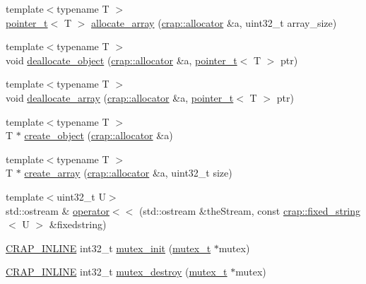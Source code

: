 \begin{DoxyCompactItemize}
\item 
{\footnotesize template$<$typename T $>$ }\\\hyperlink{structcrap_1_1pointer__t}{pointer\+\_\+t}$<$ T $>$ \hyperlink{namespacecrap_a3162468b886909833833c14fa1d87d14}{allocate\+\_\+array} (\hyperlink{classcrap_1_1allocator}{crap\+::allocator} \&a, uint32\+\_\+t array\+\_\+size)
\item 
{\footnotesize template$<$typename T $>$ }\\void \hyperlink{namespacecrap_a0bea3180ab9551219d8f108957d5fadc}{deallocate\+\_\+object} (\hyperlink{classcrap_1_1allocator}{crap\+::allocator} \&a, \hyperlink{structcrap_1_1pointer__t}{pointer\+\_\+t}$<$ T $>$ ptr)
\item 
{\footnotesize template$<$typename T $>$ }\\void \hyperlink{namespacecrap_a616c1702eb9c5a09bf18ef1f30e26da9}{deallocate\+\_\+array} (\hyperlink{classcrap_1_1allocator}{crap\+::allocator} \&a, \hyperlink{structcrap_1_1pointer__t}{pointer\+\_\+t}$<$ T $>$ ptr)
\item 
{\footnotesize template$<$typename T $>$ }\\T $\ast$ \hyperlink{namespacecrap_ac232f5afa08108381a029cabd97b9a41}{create\+\_\+object} (\hyperlink{classcrap_1_1allocator}{crap\+::allocator} \&a)
\item 
{\footnotesize template$<$typename T $>$ }\\T $\ast$ \hyperlink{namespacecrap_a90d83dbf3253a97a7228aa6fcb86c9e8}{create\+\_\+array} (\hyperlink{classcrap_1_1allocator}{crap\+::allocator} \&a, uint32\+\_\+t size)
\item 
{\footnotesize template$<$uint32\+\_\+t U$>$ }\\std\+::ostream \& \hyperlink{namespacecrap_a52bcba1c4c4b793a7120e1a9850fb989}{operator$<$$<$} (std\+::ostream \&the\+Stream, const \hyperlink{classcrap_1_1fixed__string}{crap\+::fixed\+\_\+string}$<$ U $>$ \&fixedstring)
\item 
\hyperlink{config__x86_8h_a5a40526b8d842e7ff731509998bb0f1c}{C\+R\+A\+P\+\_\+\+I\+N\+L\+I\+N\+E} int32\+\_\+t \hyperlink{namespacecrap_a79e509cd35a5ed2084ecc7cda5d5a310}{mutex\+\_\+init} (\hyperlink{namespacecrap_a8800d1b9942594aef7c29a82865908b5}{mutex\+\_\+t} $\ast$mutex)
\item 
\hyperlink{config__x86_8h_a5a40526b8d842e7ff731509998bb0f1c}{C\+R\+A\+P\+\_\+\+I\+N\+L\+I\+N\+E} int32\+\_\+t \hyperlink{namespacecrap_aa79d8f90a94e95b1a58144e749ddf2b0}{mutex\+\_\+destroy} (\hyperlink{namespacecrap_a8800d1b9942594aef7c29a82865908b5}{mutex\+\_\+t} $\ast$mutex)

\end{DoxyCompactItemize}
